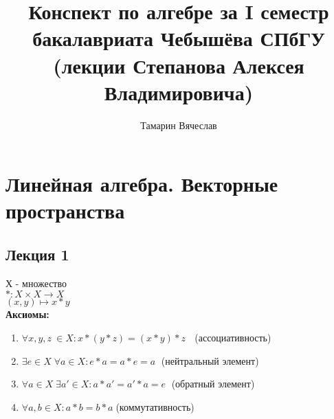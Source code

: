 \documentclass[12pt]{report}
\begin{document}
\renewcommand{\proofname}{Proof.}

\theoremstyle{plain}
\newtheorem{thm}{Theorem}[section]
\newtheorem*{lm}{Lemma}
\newtheorem*{st}{Statement}
\newtheorem*{prop}{Property}

\theoremstyle{definition}
\newtheorem{defn}{Def}
\newtheorem*{ex}{Ex}
\newtheorem*{exs}{Exs}
\newtheorem*{cor}{Corollary}
\newtheorem*{name}{Designation}

\theoremstyle{remark}
\newtheorem*{rem}{Remark}
\newtheorem*{com}{Comment}
\newtheorem*{note}{Note}
\newtheorem*{prac}{Practice}

\newcommand{\Z}{\mathbb{Z}}
\newcommand{\N}{\mathbb{N}}
\newcommand{\R}{\mathbb{R}}
\newcommand{\Q}{\mathbb{Q}}
\newcommand{\K}{\mathbb{K}}
\newcommand{\Cm}{\mathbb{C}}
\newcommand{\Pm}{\mathbb{P}}
\newcommand{\ilim}{\int\limits}
\newcommand{\slim}{\sum\limits}

\renewcommand{\@oddhead}{\hfil \thepage} 
\renewcommand{\@evenhead}{\hfil \thepage} 

\title{Конспект по алгебре за I семестр бакалавриата Чебышёва СПбГУ (лекции Степанова Алексея Владимировича)}                      
\author{Тамарин Вячеслав}
%  

\maketitle
\clearpage
\tableofcontents
\clearpage
\chapter{Линейная алгебра. Векторные пространства}
\section{Лекция 1}
Х - множество\\
$ *: X \times X \to X$\\
$ (x, y) \mapsto x * y$\\
{\bf Аксиомы:}
\begin{enumerate}
    \item $\forall x,y,z \: \in X: x*(y*z) = (x*y)*z$ $\;$ (ассоциативность)
    \item $\exists e \in X \; \forall a \in X: e*a = a*e = a \;$ (нейтральный элемент)
    \item $\forall a \in X \; \exists a' \in X: a*a' = a' * a = e \;$ (обратный элемент)
    \item $\forall a, b \in X: a * b = b * a \; $(коммутативность)
\end{enumerate}
\end{document}
